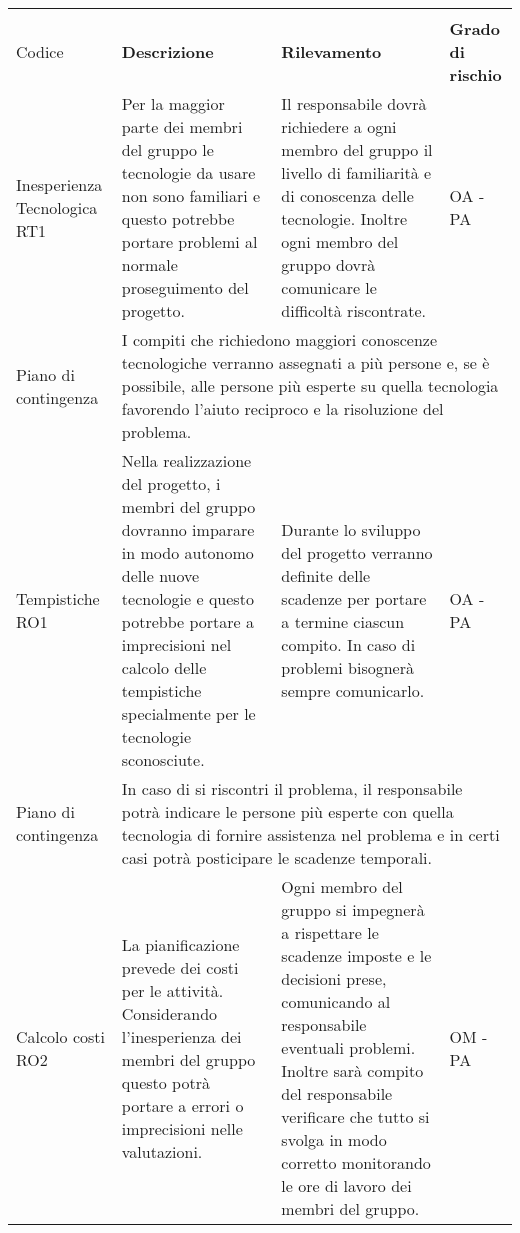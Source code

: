\begin{center}
		\begin{longtable}{|p{}|p{}|p{}|p{}|}
			\hline
			\rowcolor{lighter-grayer}
			\centering\textbf{Nome \\ Codice} & \centering\textbf{Descrizione} & \centering\textbf{Rilevamento} & \textbf{Grado di rischio} \\
			\hline
			\endfirsthead
		
		\hline
		\centering Inesperienza Tecnologica RT1& Per la maggior parte dei membri del gruppo le tecnologie da usare non sono familiari e questo potrebbe portare problemi al normale proseguimento del progetto.  & Il responsabile dovrà richiedere a ogni membro del gruppo il livello di familiarità e di conoscenza delle tecnologie. Inoltre ogni membro del gruppo dovrà comunicare le difficoltà riscontrate. &  OA - PA \\
		\hline
		\centering Piano di contingenza & \multicolumn{3}{p{0.84\textwidth}}{I compiti che richiedono maggiori conoscenze tecnologiche verranno assegnati a più persone e, se è possibile, alle persone più esperte su quella tecnologia favorendo l'aiuto reciproco e la risoluzione del problema.} \\
		\hline
		\centering Tempistiche RO1& Nella realizzazione del progetto, i membri del gruppo dovranno imparare in modo autonomo delle nuove tecnologie e questo potrebbe portare a imprecisioni nel calcolo delle tempistiche specialmente per le tecnologie sconosciute. & Durante lo sviluppo del progetto verranno definite delle scadenze per portare a termine ciascun compito. In caso di problemi bisognerà sempre comunicarlo. & OA - PA \\
		\hline
		\centering Piano di contingenza & \multicolumn{3}{p{0.84\textwidth}}{In caso di si riscontri il problema, il responsabile potrà indicare le persone più esperte con quella tecnologia di fornire assistenza nel problema e in certi casi potrà posticipare le scadenze temporali.} \\
		\hline
		\centering Calcolo costi RO2& La pianificazione prevede dei costi per le attività. Considerando l'inesperienza dei membri del gruppo questo potrà portare a errori o imprecisioni nelle valutazioni. & Ogni membro del gruppo si impegnerà a rispettare le scadenze imposte e le decisioni prese, comunicando al responsabile eventuali problemi. Inoltre sarà compito del responsabile verificare che tutto si svolga in modo corretto monitorando le ore di lavoro dei membri del gruppo. & OM - PA\\

\end{longtable}
\end{center}
